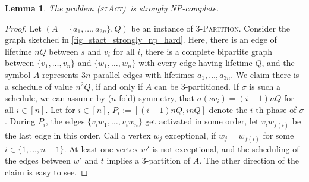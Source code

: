 \documentclass[10pt,a4paper]{article}
\newtheorem{lemma}[theorem]{Lemma}
\numberwithin{equation}{section}
\newcommand{\set}[1]{\{ #1 \}}
\newcommand{\fromto}[2]{\set{#1, \ldots, #2}}
\newcommand{\stact}{\textsc{(stAct)}}
\begin{document}
\begin{lemma}
\label{lemma_st_act_strongly_np_hard}
The problem \stact\ is strongly NP-complete. 
\end{lemma}
\begin{proof}
Let $(A = \fromto{a_1}{a_{3n}}, Q)$ be an instance of \textsc{3-Partition}. Consider the graph sketched in \cref{fig_stact_strongly_np_hard}. Here, there is an edge of lifetime $nQ$ between $s$ and $v_i$ for all $i$, there is a complete bipartite graph between $\fromto{v_1}{v_n}$ and $\fromto{w_1}{w_n}$ with every edge having lifetime $Q$, and the symbol $A$ represents $3n$ parallel edges with lifetimes $a_1, \ldots, a_{3n}$. We claim there is a schedule of value $n^2Q$, if and only if $A$ can be 3-partitioned. If $\sigma$ is such a schedule, we can assume by ($n$-fold) symmetry, that $\sigma(sv_i) = (i - 1)nQ$ for all $i \in [n]$. Let for $i \in [n]$, $P_i := [(i-1)nQ, inQ]$ denote the $i$-th phase of $\sigma$. During $P_i$, the edges $\fromto{v_iw_1}{v_iw_n}$ get activated in some order, let $v_iw_{f(i)}$ be the last edge in this order. Call a vertex $w_j$ exceptional, if $w_j = w_{f(i)}$ for some $i \in \fromto{1}{n-1}$. At least one vertex $w'$ is not exceptional, and the scheduling of the edges between $w'$ and $t$ implies a 3-partition of $A$. The other direction of the claim is easy to see.
\end{proof}
\end{document}
